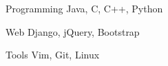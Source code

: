 

\begin{cvskills}

  \cvskill
    {Programming} %
    {Java, C, C++, Python} %

  \cvskill
    {Web} %
    {Django, jQuery, Bootstrap} %

  \cvskill
    {Tools} %
    {Vim, Git, Linux} %

\end{cvskills}
